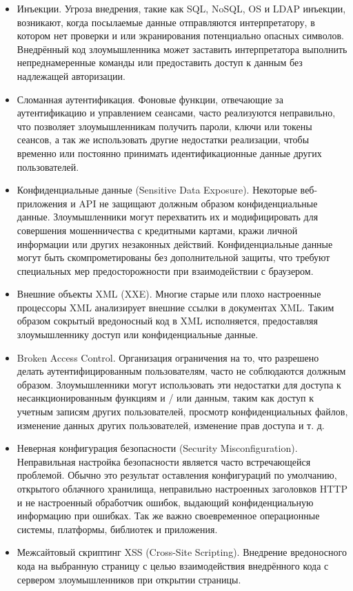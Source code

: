 \begin{itemize}
	\item Инъекции. Угроза внедрения, такие как SQL, NoSQL, OS и LDAP инъекции, возникают, когда посылаемые данные отправляются интерпретатору, в котором нет проверки и или экранирования потенциально опасных символов. Внедрённый код злоумышленника может заставить интерпретатора выполнить непреднамеренные команды или предоставить доступ к данным без надлежащей авторизации.
	\item Сломанная аутентификация. Фоновые функции, отвечающие за аутентификацию и управлением сеансами, часто реализуются неправильно, что позволяет злоумышленникам получить пароли, ключи или токены сеансов, а так же использовать другие недостатки реализации, чтобы временно или постоянно принимать идентификационные данные других пользователей.
	\item Конфиденциальные данные (Sensitive Data Exposure). Некоторые веб-приложения и API не защищают должным образом конфиденциальные данные. Злоумышленники могут перехватить их и модифицировать для совершения мошенничества с кредитными картами, кражи личной информации или других незаконных действий. Конфиденциальные данные могут быть скомпрометированы без дополнительной защиты, что требуют специальных мер предосторожности при взаимодействии с браузером.
	\item Внешние объекты XML (XXE). Многие старые или плохо настроенные процессоры XML анализирует внешние ссылки в документах XML. Таким образом сокрытый вредоносный код в XML исполняется, предоставляя злоумышленнику доступ или конфиденциальные данные.
	\item Broken Access Control. Организация ограничения на то, что разрешено делать аутентифицированным пользователям, часто не соблюдаются должным образом. Злоумышленники могут использовать эти недостатки для доступа к несанкционированным функциям и / или данным, таким как доступ к учетным записям других пользователей, просмотр конфиденциальных файлов, изменение данных других пользователей, изменение прав доступа и т. д.
	\item Неверная конфигурация безопасности (Security Misconfiguration). Неправильная настройка безопасности является часто встречающейся проблемой. Обычно это результат оставления конфигураций по умолчанию, открытого облачного хранилища, неправильно настроенных заголовков HTTP и не настроенный обработчик ошибок, выдающий конфиденциальную информацию при ошибках. Так же важно своевременное операционные системы, платформы, библиотек и приложения.
	\item Межсайтовый скриптинг XSS (Cross-Site Scripting). Внедрение вредоносного кода на выбранную страницу с целью взаимодействия внедрённого кода с сервером злоумышленников при открытии страницы.

\end{itemize}
